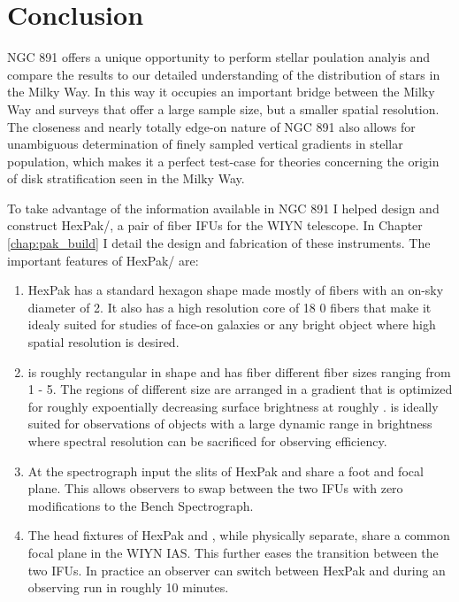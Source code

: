 \chapter[Conclusion]{Conclusion}
\label{chap:conclusion}


\clearpage
NGC 891 offers a unique opportunity to perform stellar poulation
analyis and compare the results to our detailed understanding of the
distribution of stars in the Milky Way. In this way it occupies an
important bridge between the Milky Way and surveys that offer a large
sample size, but a smaller spatial resolution. The closeness and
nearly totally edge-on nature of NGC 891 also allows for unambiguous
determination of finely sampled vertical gradients in stellar
population, which makes it a perfect test-case for theories concerning
the origin of disk stratification seen in the Milky Way.

To take advantage of the information available in NGC 891 I helped
design and construct HexPak/\GP, a pair of fiber IFUs for the WIYN
telescope. In Chapter \ref{chap:pak_build} I detail the design and
fabrication of these instruments. The important features of HexPak/\GP
are:
\begin{enumerate}
\item HexPak has a standard hexagon shape made mostly of fibers with
  an on-sky diameter of 2. It also has a high resolution core
  of 18 0 fibers that make it idealy suited for studies of
  face-on galaxies or any bright object where high spatial resolution
  is desired.

\item \GP is roughly rectangular in shape and has fiber different
  fiber sizes ranging from 1 - 5. The regions of
  different size are arranged in a gradient that is optimized for
  roughly expoentially decreasing surface brightness at roughly
  . \GP is ideally suited for observations of objects
  with a large dynamic range in brightness where spectral resolution
  can be sacrificed for observing efficiency.

\item At the spectrograph input the slits of HexPak and \GP share a
  foot and focal plane. This allows observers to swap between the two
  IFUs with zero modifications to the Bench Spectrograph.

\item The head fixtures of HexPak and \GP, while physically separate,
  share a common focal plane in the WIYN IAS. This further eases the
  transition between the two IFUs. In practice an observer can switch
  between HexPak and \GP during an observing run in roughly 10
  minutes.

\end{enumerate}

